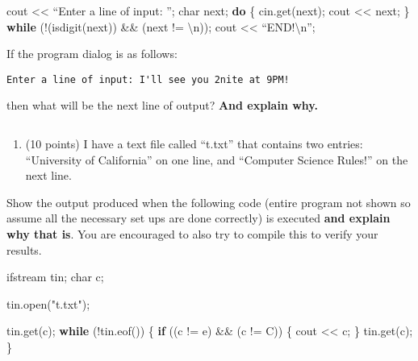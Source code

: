 \documentclass[
]{article}
\newenvironment{Shaded}{}{}
\newcommand{\CharTok}[1]{\textcolor[rgb]{0.25,0.44,0.63}{#1}}
\newcommand{\ControlFlowTok}[1]{\textcolor[rgb]{0.00,0.44,0.13}{\textbf{#1}}}
\newcommand{\DataTypeTok}[1]{\textcolor[rgb]{0.56,0.13,0.00}{#1}}
\newcommand{\NormalTok}[1]{#1}
\newcommand{\SpecialCharTok}[1]{\textcolor[rgb]{0.25,0.44,0.63}{#1}}
\newcommand{\StringTok}[1]{\textcolor[rgb]{0.25,0.44,0.63}{#1}}
\providecommand{\tightlist}{%
  \setlength{\itemsep}{0pt}\setlength{\parskip}{0pt}}
\begin{document}
\begin{Shaded}
\begin{Highlighting}[]
\NormalTok{cout \textless{}\textless{} “Enter a line of input: ”;}
\DataTypeTok{char}\NormalTok{ next;}
\ControlFlowTok{do}\NormalTok{ \{}
\NormalTok{   cin.get(next);}
\NormalTok{   cout \textless{}\textless{} next;}
\NormalTok{\} }\ControlFlowTok{while}\NormalTok{ (!(isdigit(next)) \&\& (next != }\CharTok{\textquotesingle{}}\SpecialCharTok{\textbackslash{}n}\CharTok{\textquotesingle{}}\NormalTok{));}
\NormalTok{cout \textless{}\textless{} “END!\textbackslash{}n”;}
\end{Highlighting}
\end{Shaded}

If the program dialog is as follows:

\begin{verbatim}
Enter a line of input: I'll see you 2nite at 9PM!
\end{verbatim}

then what will be the next line of output? \textbf{And explain why.}

\begin{verbatim}
\end{verbatim}

\pagebreak

\begin{enumerate}
\def\labelenumi{\arabic{enumi}.}
\setcounter{enumi}{2}
\tightlist
\item
  (10 points) I have a text file called ``t.txt'' that contains two
  entries: ``University of California'' on one line, and ``Computer
  Science Rules!'' on the next line.
\end{enumerate}

Show the output produced when the following code (entire program not
shown so assume all the necessary set ups are done correctly) is
executed \textbf{and explain why that is}. You are encouraged to also
try to compile this to verify your results.

\begin{Shaded}
\begin{Highlighting}[]
\NormalTok{ifstream tin;}
\DataTypeTok{char}\NormalTok{ c;}

\NormalTok{tin.open(}\StringTok{"t.txt"}\NormalTok{);}

\NormalTok{tin.get(c);}
\ControlFlowTok{while}\NormalTok{ (!tin.eof()) \{}
   \ControlFlowTok{if}\NormalTok{ ((c != }\CharTok{\textquotesingle{}e\textquotesingle{}}\NormalTok{) \&\& (c != }\CharTok{\textquotesingle{}C\textquotesingle{}}\NormalTok{)) \{}
\NormalTok{      cout \textless{}\textless{} c;}
\NormalTok{   \}}
\NormalTok{   tin.get(c);}
\NormalTok{\}}
\end{Highlighting}
\end{Shaded}
\end{document}
